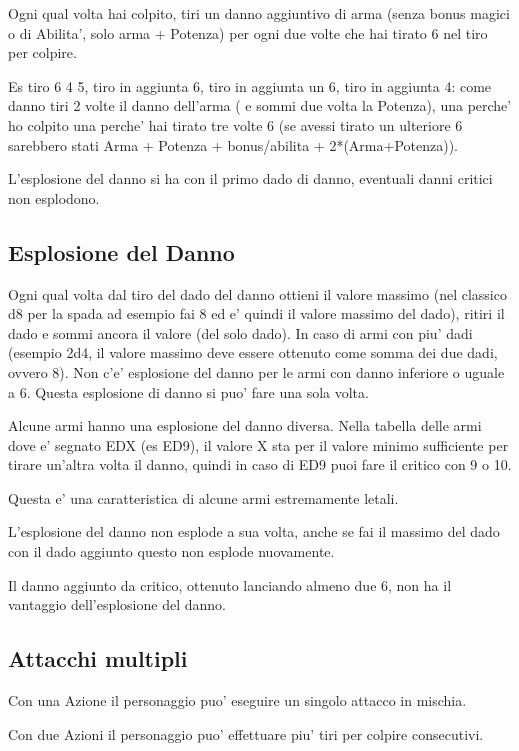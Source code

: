 \documentclass[a4paper,11pt,twoside,openany]{book}
\begin{document}
Ogni qual volta hai colpito, tiri un danno aggiuntivo di arma (senza bonus magici o di Abilita', solo arma + Potenza) per ogni due volte che hai tirato 6 nel tiro per colpire.

Es tiro 6 4 5, tiro in aggiunta 6, tiro in aggiunta un 6, tiro in aggiunta 4: come danno tiri 2 volte il danno dell'arma ( e sommi due volta la Potenza), una perche' ho colpito una perche' hai tirato tre volte 6 (se avessi tirato un ulteriore 6 sarebbero stati Arma + Potenza + bonus/abilita + 2{*}(Arma+Potenza)).

L'esplosione del danno si ha con il primo dado di danno, eventuali danni critici non esplodono.

\subsection{Esplosione del Danno}

Ogni qual volta dal tiro del dado del danno ottieni il valore massimo (nel classico d8 per la spada ad esempio fai 8 ed e' quindi il valore massimo del dado), ritiri il dado e sommi ancora il valore (del solo dado). In caso di armi con piu' dadi (esempio 2d4, il valore massimo deve essere ottenuto come somma dei due dadi, ovvero 8). Non c'e' esplosione del danno per le armi con danno inferiore o uguale a 6. Questa esplosione di danno si puo' fare una sola volta.

Alcune armi hanno una esplosione del danno diversa. Nella tabella delle armi dove e' segnato EDX (es ED9), il valore X sta per il valore minimo sufficiente per tirare un'altra volta il danno, quindi in caso di ED9 puoi fare il critico con 9 o 10.

Questa e' una caratteristica di alcune armi estremamente letali.

L'esplosione del danno non esplode a sua volta, anche se fai il massimo del dado con il dado aggiunto questo non esplode nuovamente.

Il danno aggiunto da critico, ottenuto lanciando almeno due 6, non ha il vantaggio dell'esplosione del danno.

\subsection{Attacchi multipli}

Con una Azione il personaggio puo' eseguire un singolo attacco in mischia.

Con due Azioni il personaggio puo' effettuare piu' tiri per colpire consecutivi.
\end{document}
